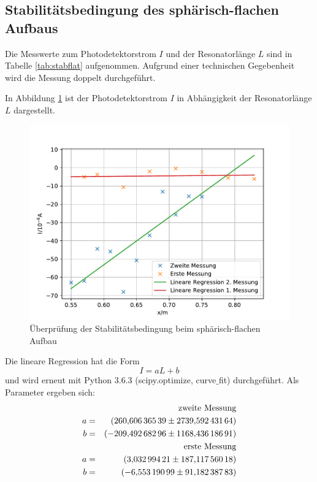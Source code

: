 \subsection{Stabilitätsbedingung des sphärisch-flachen Aufbaus}
Die Messwerte zum Photodetektorstrom $I$ und der Resonatorlänge $L$ sind in Tabelle \ref{tab:stabflat} aufgenommen.
Aufgrund einer technischen Gegebenheit wird die Messung doppelt durchgeführt.

In Abbildung \ref{fig:stabflat} ist der Photodetektorstrom $I$ in Abhängigkeit der Resonatorlänge $L$ dargestellt.
\begin{figure}
  \centering
  \includegraphics[width=\textwidth]{stabflat.pdf}
  \caption{Überprüfung der Stabilitätsbedingung beim sphärisch-flachen Aufbau}
  \label{fig:stabflat}
\end{figure}
Die lineare Regression hat die Form
\begin{equation*}
  I= aL+b
\end{equation*}
und wird erneut mit Python 3.6.3 (scipy.optimize, curve$\_$fit) durchgeführt.
Als Parameter ergeben sich:
\begin{align*}
&&\text{zweite Messung} \\
a &=& \SI{260.60636539 \pm 2739.59243164}{} \\
b &=& \SI{-209.49268296 \pm 1168.43618691}{} \\
&&\text{erste Messung} \\
a &=& \SI{3.03299421 \pm 187.11756018}{} \\
b &=& \SI{-6.55319099 \pm 91.18238783}{} \\
\end{align*}
\FloatBarrier

